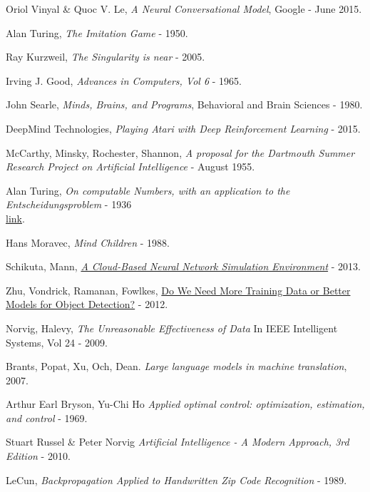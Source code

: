 \documentclass[12pt]{article}
\begin{document}
\begin{thebibliography}{20}

   Oriol Vinyal \& Quoc V. Le,
  {\em A Neural Conversational Model}, Google - June 2015.

   Alan Turing, {\em The Imitation Game} - 1950.

   Ray Kurzweil, {\em The Singularity is near} - 2005.

   Irving J. Good, {\em Advances in Computers, Vol 6} - 1965.

   John Searle, {\em Minds, Brains, and Programs},
  Behavioral and Brain Sciences - 1980.

   DeepMind Technologies, {\em Playing Atari with Deep
  Reinforcement Learning} - 2015.

   McCarthy, Minsky, Rochester, Shannon, {\em
  A proposal for the Dartmouth Summer Research Project on Artificial
  Intelligence} - August 1955.

   Alan Turing, {\em On computable Numbers, with an
  application to the Entscheidungsproblem} - 1936 \\
  \href{http://www.cs.virginia.edu/~robins/Turing_Paper_1936.pdf}{link}.

   Hans Moravec, {\em Mind Children} - 1988.

   Schikuta, Mann,
  \href{http://eprints.cs.univie.ac.at/3708/1/paper57.pdf}
  {{\em A Cloud-Based Neural Network Simulation Environment}} - 2013.

   Zhu, Vondrick, Ramanan, Fowlkes,
  \href{http://web.mit.edu/vondrick/largetrain.pdf}
  {Do We Need More Training Data or Better Models for Object Detection?} - 2012.

   Norvig, Halevy, {\em The Unreasonable Effectiveness of Data}
  In IEEE Intelligent Systems, Vol 24 - 2009.

   Brants, Popat, Xu, Och, Dean. {\em Large language models in machine
  translation}, 2007.

   Arthur Earl Bryson, Yu-Chi Ho
  {\em Applied optimal control: optimization, estimation, and control} - 1969.

   Stuart Russel \& Peter Norvig
  {\em Artificial Intelligence - A Modern Approach, 3rd Edition} - 2010.

   LeCun,
  {\em Backpropagation Applied to Handwritten Zip Code Recognition} - 1989.


\end{thebibliography}
\end{document}
